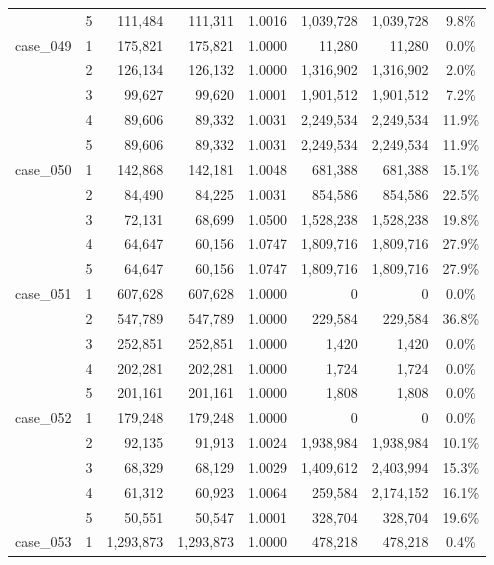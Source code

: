 \begin{footnotesize}
\begin{longtable}{l c rr c rr c}
 & 5 & 111{,}484 & 111{,}311 & 1.0016 & 1{,}039{,}728 & 1{,}039{,}728 & 9.8\% \\
\addlinespace[2pt]
case\_049 & 1 & 175{,}821 & 175{,}821 & 1.0000 & 11{,}280 & 11{,}280 & 0.0\% \\
 & 2 & 126{,}134 & 126{,}132 & 1.0000 & 1{,}316{,}902 & 1{,}316{,}902 & 2.0\% \\
 & 3 & 99{,}627 & 99{,}620 & 1.0001 & 1{,}901{,}512 & 1{,}901{,}512 & 7.2\% \\
 & 4 & 89{,}606 & 89{,}332 & 1.0031 & 2{,}249{,}534 & 2{,}249{,}534 & 11.9\% \\
 & 5 & 89{,}606 & 89{,}332 & 1.0031 & 2{,}249{,}534 & 2{,}249{,}534 & 11.9\% \\
\addlinespace[2pt]
case\_050 & 1 & 142{,}868 & 142{,}181 & 1.0048 & 681{,}388 & 681{,}388 & 15.1\% \\
 & 2 & 84{,}490 & 84{,}225 & 1.0031 & 854{,}586 & 854{,}586 & 22.5\% \\
 & 3 & 72{,}131 & 68{,}699 & 1.0500 & 1{,}528{,}238 & 1{,}528{,}238 & 19.8\% \\
 & 4 & 64{,}647 & 60{,}156 & 1.0747 & 1{,}809{,}716 & 1{,}809{,}716 & 27.9\% \\
 & 5 & 64{,}647 & 60{,}156 & 1.0747 & 1{,}809{,}716 & 1{,}809{,}716 & 27.9\% \\
\addlinespace[2pt]
case\_051 & 1 & 607{,}628 & 607{,}628 & 1.0000 & 0 & 0 & 0.0\% \\
 & 2 & 547{,}789 & 547{,}789 & 1.0000 & 229{,}584 & 229{,}584 & 36.8\% \\
 & 3 & 252{,}851 & 252{,}851 & 1.0000 & 1{,}420 & 1{,}420 & 0.0\% \\
 & 4 & 202{,}281 & 202{,}281 & 1.0000 & 1{,}724 & 1{,}724 & 0.0\% \\
 & 5 & 201{,}161 & 201{,}161 & 1.0000 & 1{,}808 & 1{,}808 & 0.0\% \\
\addlinespace[2pt]
case\_052 & 1 & 179{,}248 & 179{,}248 & 1.0000 & 0 & 0 & 0.0\% \\
 & 2 & 92{,}135 & 91{,}913 & 1.0024 & 1{,}938{,}984 & 1{,}938{,}984 & 10.1\% \\
 & 3 & 68{,}329 & 68{,}129 & 1.0029 & 1{,}409{,}612 & 2{,}403{,}994 & 15.3\% \\
 & 4 & 61{,}312 & 60{,}923 & 1.0064 & 259{,}584 & 2{,}174{,}152 & 16.1\% \\
 & 5 & 50{,}551 & 50{,}547 & 1.0001 & 328{,}704 & 328{,}704 & 19.6\% \\
\addlinespace[2pt]
case\_053 & 1 & 1{,}293{,}873 & 1{,}293{,}873 & 1.0000 & 478{,}218 & 478{,}218 & 0.4\% \\

\end{longtable}
\end{footnotesize}
